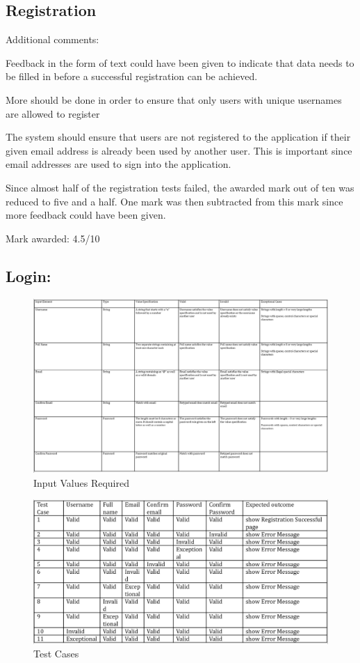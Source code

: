\documentclass[english]{article}
\begin{document}
	\subsection{Registration}
Additional comments: 

Feedback in the form of text could have been given to indicate that data needs to be filled in before a successful registration can be achieved.

More should be done in order to ensure that only users with unique usernames are allowed to register

The system should ensure that users are not registered to the application if their given email address is already been used by another user. This is important since email addresses are used to sign into the application.

Since almost half of the registration tests failed, the awarded mark out of ten was reduced to five and a half. One mark was then subtracted from this mark since more feedback could have been given.

Mark awarded: 4.5/10

\subsection{Login:}

\begin{figure}[H]
\centering
\includegraphics[width=1.0\textwidth]{login_input_values_required}
\caption{Input Values Required}
\end{figure}

\begin{figure}[H]
\centering
\includegraphics[width=1.0\textwidth]{login_test_cases}
\caption{Test Cases}
\end{figure}
\end{document}
